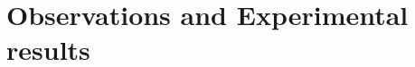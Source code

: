 \documentclass{article}
\begin{document}
\section{Observations and Experimental results}

\begin{figure}[htb!]
\begin{center}
\begin{minipage}[h]{0.47\linewidth}
\end{minipage}
\hfill
\begin{minipage}[h]{0.47\linewidth}
\end{minipage}



\end{center}
\end{figure}
\end{document}
